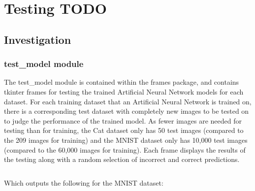 \documentclass[./project-report/src/latex/project-report.tex]{subfiles}
\begin{document}
\maketitle

\section{Testing TODO}

\subsection{Investigation}

\subsubsection{test\_model module}
\label{sec:test_model-module}

The test\_model module is contained within the frames package, and contains tkinter frames for testing the trained Artificial Neural Network models for each dataset. 
For each training dataset that an Artificial Neural Network is trained on, there is a corresponding test dataset with completely new images to be tested on to judge 
the performance of the trained model. As fewer images are needed for testing than for training, the Cat dataset only has 50 test images (compared to the 209 images 
for training) and the MNIST dataset only has 10,000 test images (compared to the 60,000 images for training).
Each frame displays the results of the testing along with a random selection of incorrect and correct predictions.

\inputminted{python}{./school_project/frames/test_model.py}

Which outputs the following for the MNIST dataset:

\pagebreak

\begin{figure}[h!]
\centering
{}
\end{figure}
\end{document}
